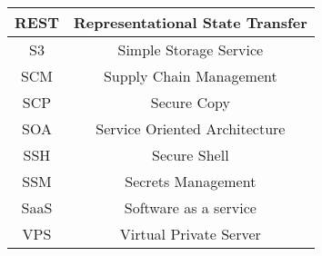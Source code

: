 \begin{table}[!htpb]
\begin{tabular}{| c | c |}
        \hline
        REST & Representational State Transfer\\
        \hline
        S3   & Simple Storage Service\\
        \hline
        SCM  & Supply Chain Management\\
        \hline
        SCP & Secure Copy\\
        \hline
        SOA  & Service Oriented Architecture\\
        \hline
        SSH & Secure Shell\\
        \hline
        SSM  & Secrets Management\\
        \hline
        SaaS & Software as a service\\
        \hline
        VPS  & Virtual Private Server\\
        \hline
    \end{tabular}
\end{table}
